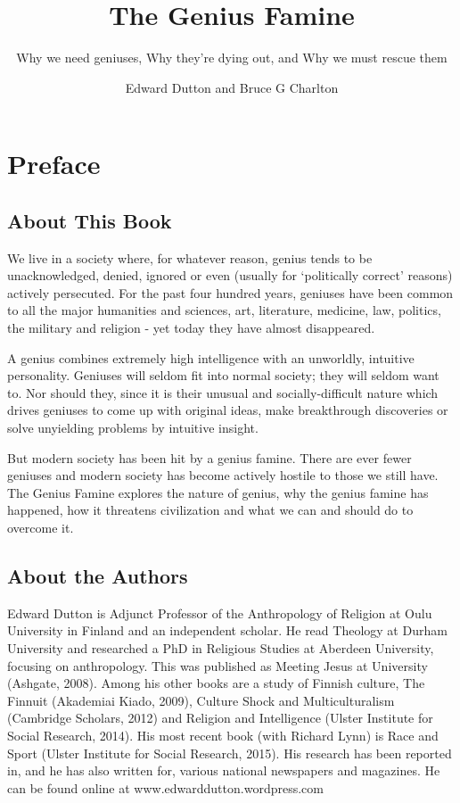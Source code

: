 \documentclass[
]{book}
\title{The Genius Famine}
\subtitle{Why we need geniuses, Why they're dying out, and Why we must rescue them}
\author{Edward Dutton and Bruce G Charlton}
\date{}
\begin{document}
\maketitle

{
\setcounter{tocdepth}{1}
\tableofcontents
}
\hypertarget{preface}{%
\chapter*{Preface}\label{preface}}

\hypertarget{about-this-book}{%
\section*{About This Book}\label{about-this-book}}

We live in a society where, for whatever reason, genius tends to be unacknowledged, denied, ignored or even (usually for `politically correct' reasons) actively persecuted. For the past four hundred years, geniuses have been common to all the major humanities and sciences, art, literature, medicine, law, politics, the military and religion - yet today they have almost disappeared.

A genius combines extremely high intelligence with an unworldly, intuitive personality. Geniuses will seldom fit into normal society; they will seldom want to. Nor should they, since it is their unusual and socially-difficult nature which drives geniuses to come up with original ideas, make breakthrough discoveries or solve unyielding problems by intuitive insight.

But modern society has been hit by a genius famine. There are ever fewer geniuses and modern society has become actively hostile to those we still have. The Genius Famine explores the nature of genius, why the genius famine has happened, how it threatens civilization and what we can and should do to overcome it.

\hypertarget{about-the-authors}{%
\section*{About the Authors}\label{about-the-authors}}

Edward Dutton is Adjunct Professor of the Anthropology of Religion at Oulu University in Finland and an independent scholar. He read Theology at Durham University and researched a PhD in Religious Studies at Aberdeen University, focusing on anthropology. This was published as Meeting Jesus at University (Ashgate, 2008). Among his other books are a study of Finnish culture, The Finnuit (Akademiai Kiado, 2009), Culture Shock and Multiculturalism (Cambridge Scholars, 2012) and Religion and Intelligence (Ulster Institute for Social Research, 2014). His most recent book (with Richard Lynn) is Race and Sport (Ulster Institute for Social Research, 2015). His research has been reported in, and he has also written for, various national newspapers and magazines. He can be found online at www.edwarddutton.wordpress.com
\end{document}
